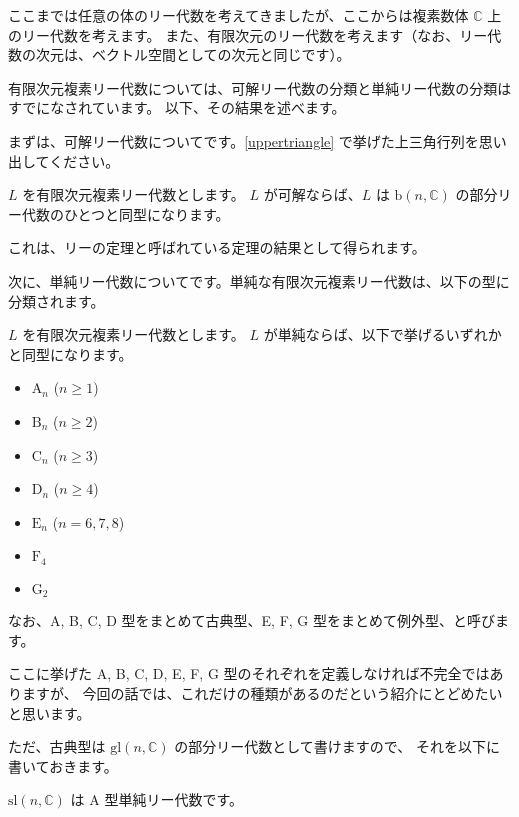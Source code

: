 \documentclass{ltjsarticle}
\begin{document}
ここまでは任意の体のリー代数を考えてきましたが、ここからは複素数体 $\mathbb{C}$ 上のリー代数を考えます。
また、有限次元のリー代数を考えます（なお、リー代数の次元は、ベクトル空間としての次元と同じです）。

有限次元複素リー代数については、可解リー代数の分類と単純リー代数の分類はすでになされています。
以下、その結果を述べます。

まずは、可解リー代数についてです。\cref{uppertriangle} で挙げた上三角行列を思い出してください。

\begin{theorem}[可解リー代数の分類]
    $L$ を有限次元複素リー代数とします。
    $L$ が可解ならば、$L$ は $\mathrm{b}(n,\mathbb{C})$ の部分リー代数のひとつと同型になります。
\end{theorem}

これは、リーの定理と呼ばれている定理の結果として得られます。

次に、単純リー代数についてです。単純な有限次元複素リー代数は、以下の型に分類されます。

\begin{theorem}[単純リー代数の分類]
    $L$ を有限次元複素リー代数とします。
    $L$ が単純ならば、以下で挙げるいずれかと同型になります。
    \begin{itemize}
        \item $\mathrm{A}_n$ ($n \geq 1$)
        \item $\mathrm{B}_n$ ($n \geq 2$)
        \item $\mathrm{C}_n$ ($n \geq 3$)
        \item $\mathrm{D}_n$ ($n \geq 4$)
        \item $\mathrm{E}_n$ ($n = 6,7,8$)
        \item $\mathrm{F}_4$
        \item $\mathrm{G}_2$
    \end{itemize}
    なお、A, B, C, D 型をまとめて古典型、E, F, G 型をまとめて例外型、と呼びます。
\end{theorem}

ここに挙げた A, B, C, D, E, F, G 型のそれぞれを定義しなければ不完全ではありますが、
今回の話では、これだけの種類があるのだという紹介にとどめたいと思います。

ただ、古典型は $\mathrm{gl}(n,\mathbb{C})$ の部分リー代数として書けますので、
それを以下に書いておきます。

\begin{example}[A型単純リー代数]
    $\mathrm{sl}(n,\mathbb{C})$ は A 型単純リー代数です。
\end{example}
\end{document}
